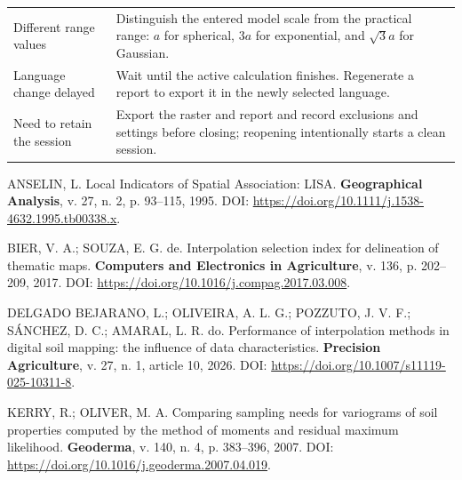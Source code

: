 \documentclass[11pt,a4paper]{article}
\begin{document}
\begin{longtable}{P{0.30\textwidth}P{0.62\textwidth}}
Different range values & Distinguish the entered model scale from the practical range: $a$ for spherical, $3a$ for exponential, and $\sqrt{3}a$ for Gaussian. \\
Language change delayed & Wait until the active calculation finishes. Regenerate a report to export it in the newly selected language. \\
Need to retain the session & Export the raster and report and record exclusions and settings before closing; reopening intentionally starts a clean session. \\
\bottomrule
\end{longtable}

\clearpage
\begin{thebibliography}{99}
\raggedright


ANSELIN, L. Local Indicators of Spatial Association: LISA. \textbf{Geographical Analysis}, v. 27, n. 2, p. 93--115, 1995. DOI: \url{https://doi.org/10.1111/j.1538-4632.1995.tb00338.x}.

BIER, V. A.; SOUZA, E. G. de. Interpolation selection index for delineation of thematic maps. \textbf{Computers and Electronics in Agriculture}, v. 136, p. 202--209, 2017. DOI: \url{https://doi.org/10.1016/j.compag.2017.03.008}.


DELGADO BEJARANO, L.; OLIVEIRA, A. L. G.; POZZUTO, J. V. F.; SÁNCHEZ, D. C.; AMARAL, L. R. do. Performance of interpolation methods in digital soil mapping: the influence of data characteristics. \textbf{Precision Agriculture}, v. 27, n. 1, article 10, 2026. DOI: \url{https://doi.org/10.1007/s11119-025-10311-8}.


KERRY, R.; OLIVER, M. A. Comparing sampling needs for variograms of soil properties computed by the method of moments and residual maximum likelihood. \textbf{Geoderma}, v. 140, n. 4, p. 383--396, 2007. DOI: \url{https://doi.org/10.1016/j.geoderma.2007.04.019}.


\end{thebibliography}
\end{document}
